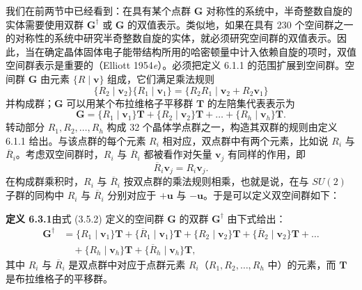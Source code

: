 我们在前两节中已经看到：在具有某个点群 $\mathbf{G}$ 对称性的系统中，半奇整数自旋的实体需要使用双群 $\mathbf{G}^{\dagger}$ 或 $\mathbf{G}$ 的双值表示。类似地，如果在具有 230 个空间群之一的对称性的系统中研究半奇整数自旋的实体，就必须研究空间群的双值表示。因此，当在确定晶体固体电子能带结构所用的哈密顿量中计入依赖自旋的项时，双值空间群表示是重要的（Elliott 1954\textit{e}）。必须把定义 6.1.1 的范围扩展到空间群。空间群 $\mathbf{G}$ 由元素 $\{R \mid \mathbf{v}\}$ 组成，它们满足乘法规则
\begin{equation*}
\{R_{2} \mid \mathbf{v}_{2}\}\{R_{1} \mid \mathbf{v}_{1}\} = \{R_{2}R_{1} \mid \mathbf{v}_{2} + R_{2}\mathbf{v}_{1}\}
\tag{1.5.3}
\end{equation*}
并构成群；$\mathbf{G}$ 可以用某个布拉维格子平移群 $\mathbf{T}$ 的左陪集代表表示为
\begin{equation*}
\mathbf{G} = \{R_{1} \mid \mathbf{v}_{1}\}\mathbf{T} + \{R_{2} \mid \mathbf{v}_{2}\}\mathbf{T} + \dots + \{R_{h} \mid \mathbf{v}_{h}\}\mathbf{T}.
\tag{3.5.2}
\end{equation*}
转动部分 $R_{1}, R_{2}, \dots, R_{h}$ 构成 32 个晶体学点群之一，构造其双群的规则由定义 6.1.1 给出。与该点群的每个元素 $R_{i}$ 相对应，双点群中有两个元素，比如说 $R_{i}$ 与 $\overline{R}_{i}$。考虑双空间群时，$R_{i}$ 与 $\overline{R}_{i}$ 都被看作对矢量 $\mathbf{v}_{j}$ 有同样的作用，即
\begin{equation*}
\overline{R}_{i}\mathbf{v}_{j} = R_{i}\mathbf{v}_{j}.
\tag{6.3.1}
\end{equation*}
在构成群乘积时，$R_{i}$ 与 $\overline{R}_{i}$ 按双点群的乘法规则相乘，也就是说，在与 $SU(2)$ 子群的同构中 $R_{i}$ 与 $\overline{R}_{i}$ 分别对应于 $+\mathbf{u}$ 与 $-\mathbf{u}$。于是可以定义双空间群如下：

\noindent\textbf{定义 6.3.1}\quad 由式 (3.5.2) 定义的空间群 $\mathbf{G}$ 的双群 $\mathbf{G}^{\dagger}$ 由下式给出：
\begin{equation*}
\begin{array}{rl}
\mathbf{G}^{\dagger} &= \{R_{1} \mid \mathbf{v}_{1}\}\mathbf{T} + \{\overline{R}_{1} \mid \mathbf{v}_{1}\}\mathbf{T} + \{R_{2} \mid \mathbf{v}_{2}\}\mathbf{T} + \{\overline{R}_{2} \mid \mathbf{v}_{2}\}\mathbf{T} + \dots\\
&\quad + \{R_{h} \mid \mathbf{v}_{h}\}\mathbf{T} + \{\overline{R}_{h} \mid \mathbf{v}_{h}\}\mathbf{T},
\end{array}
\tag{6.3.2}
\end{equation*}
其中 $R_{i}$ 与 $\overline{R}_{i}$ 是双点群中对应于点群元素 $R_{i}$（$R_{1}, R_{2}, \dots, R_{h}$ 中）的元素，而 $\mathbf{T}$ 是布拉维格子的平移群。

